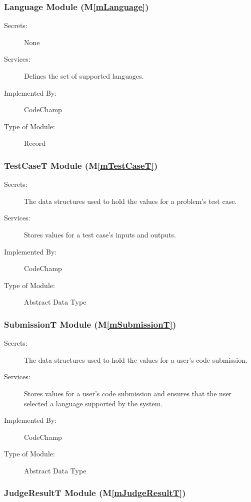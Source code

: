 \documentclass[12pt, titlepage]{article}
\newcommand{\mref}[1]{M\ref{#1}}
\begin{document}
\subsubsection{ Language Module (\mref{mLanguage})}

\begin{description}
\item[Secrets:] None
\item[Services:] Defines the set of supported languages.
\item[Implemented By:] CodeChamp
\item[Type of Module:] Record
\end{description}

\subsubsection{ TestCaseT Module (\mref{mTestCaseT})}

\begin{description}
\item[Secrets:] The data structures used to hold the values for a problem's test case.
\item[Services:] Stores values for a test case's inputs and outputs.
\item[Implemented By:] CodeChamp
\item[Type of Module:] Abstract Data Type
\end{description}

\subsubsection{ SubmissionT Module (\mref{mSubmissionT})}

\begin{description}
\item[Secrets:] The data structures used to hold the values for a user's code submission.
\item[Services:] Stores values for a user's code submission and ensures that the user selected a language supported by the system. 
\item[Implemented By:] CodeChamp
\item[Type of Module:] Abstract Data Type
\end{description}

\subsubsection{ JudgeResultT Module (\mref{mJudgeResultT})}
\end{document}
